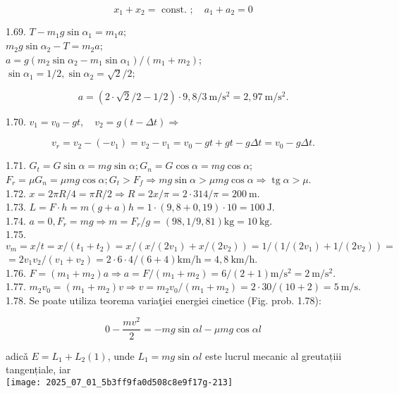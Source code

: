 $$
x_{1}+x_{2}=\text { const. } ; \quad a_{1}+a_{2}=0
$$

1.69. $T-m_{1} g \sin \alpha_{1}=m_{1} a$;\\
$m_{2} g \sin \alpha_{2}-T=m_{2} a$;\\
$a=g\left(m_{2} \sin \alpha_{2}-m_{1} \sin \alpha_{1}\right) /\left(m_{1}+m_{2}\right)$;\\
$\sin \alpha_{1}=1 / 2, \sin \alpha_{2}=\sqrt{2} / 2$;

$$
a=(2 \cdot \sqrt{2} / 2-1 / 2) \cdot 9,8 / 3 \mathrm{~m} / \mathrm{s}^{2}=2,97 \mathrm{~m} / \mathrm{s}^{2} .
$$

1.70. $v_{1}=v_{0}-g t, \quad v_{2}=g(t-\Delta t) \Rightarrow$

$$
v_{r}=v_{2}-\left(-v_{1}\right)=v_{2}-v_{1}=v_{0}-g t+g t-g \Delta t=v_{0}-g \Delta t .
$$

1.71. $G_{t}=G \sin \alpha=m g \sin \alpha ; G_{n}=G \cos \alpha=m g \cos \alpha$;\\
$F_{r}=\mu G_{n}=\mu m g \cos \alpha ; G_{t}>F_{f} \Rightarrow m g \sin \alpha>\mu m g \cos \alpha \Rightarrow \operatorname{tg} \alpha>\mu$.\\
1.72. $x=2 \pi R / 4=\pi R / 2 \Rightarrow R=2 x / \pi=2 \cdot 314 / \pi=200 \mathrm{~m}$.\\
1.73. $L=F \cdot h=m(g+a) h=1 \cdot(9,8+0,19) \cdot 10=100 \mathrm{~J}$.\\
1.74. $a=0, F_{r}=m g \Rightarrow m=F_{r} / g=(98,1 / 9,81) \mathrm{kg}=10 \mathrm{~kg}$.\\
1.75. $v_{m}=x / t=x /\left(t_{1}+t_{2}\right)=x /\left(x /\left(2 v_{1}\right)+x /\left(2 v_{2}\right)\right)=1 /\left(1 /\left(2 v_{1}\right)+1 /\left(2 v_{2}\right)\right)=$ $=2 v_{1} v_{2} /\left(v_{1}+v_{2}\right)=2 \cdot 6 \cdot 4 /(6+4) \mathrm{km} / \mathrm{h}=4,8 \mathrm{~km} / \mathrm{h}$.\\
1.76. $F=\left(m_{1}+m_{2}\right) a \Rightarrow a=F /\left(m_{1}+m_{2}\right)=6 /(2+1) \mathrm{m} / \mathrm{s}^{2}=2 \mathrm{~m} / \mathrm{s}^{2}$.\\
1.77. $m_{2} v_{0}=\left(m_{1}+m_{2}\right) v \Rightarrow v=m_{2} v_{0} /\left(m_{1}+m_{2}\right)=2 \cdot 30 /(10+2)=5 \mathrm{~m} / \mathrm{s}$.\\
1.78. Se poate utiliza teorema variaţiei energiei cinetice (Fig. prob. 1.78):

$$
0-\frac{m v^{2}}{2}=-m g \sin \alpha l-\mu m g \cos \alpha l
$$

adicǎ $E=L_{1}+L_{2}(1)$, unde $L_{1}=m g \sin \alpha l$ este lucrul mecanic al greutațiii tangențiale, iar\\
\texttt{[image: 2025\_07\_01\_5b3ff9fa0d508c8e9f17g-213]}

